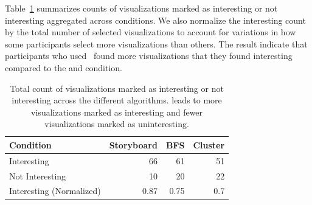 Table~\ref{table:interestingScore} summarizes counts of visualizations marked as interesting or not interesting aggregated across conditions. We also normalize the interesting count by the total number of selected visualizations to account for variations in how some participants select more visualizations than others. The result indicate that participants who used \system\ found more visualizations that they found interesting compared to the \BFS  and \cluster condition.
\begin{table}[ht!]
	\centering
	\begin{tabular}{lrrr}
	\hline
	 Condition             &   Storyboard &   BFS &   Cluster \\
	\hline
	 Interesting            &  \cellcolor{blue!25}       66    & 61    &      51   \\
	 Not Interesting        &  \cellcolor{blue!25}       10    & 20    &      22   \\
	 Interesting (Normalized) &   \cellcolor{blue!25}       0.87 &  0.75 &       0.7 \\
	\hline
	\end{tabular}
	\caption{Total count of visualizations marked as interesting or not interesting across the different algorithms. \system leads to more visualizations marked as interesting and fewer visualizations marked as uninteresting.}
	\label{table:interestingScore}
	\vspace{-20pt}
\end{table}
